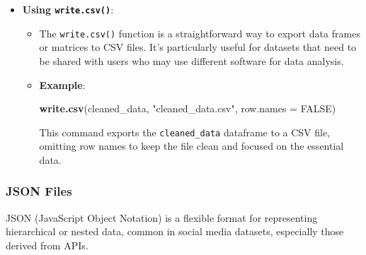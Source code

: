 \documentclass[
]{book}
\newenvironment{Shaded}{\begin{snugshade}}{\end{snugshade}}
\newcommand{\AttributeTok}[1]{\textcolor[rgb]{0.13,0.29,0.53}{#1}}
\newcommand{\ConstantTok}[1]{\textcolor[rgb]{0.56,0.35,0.01}{#1}}
\newcommand{\FunctionTok}[1]{\textcolor[rgb]{0.13,0.29,0.53}{\textbf{#1}}}
\newcommand{\NormalTok}[1]{#1}
\newcommand{\StringTok}[1]{\textcolor[rgb]{0.31,0.60,0.02}{#1}}
\providecommand{\tightlist}{%
  \setlength{\itemsep}{0pt}\setlength{\parskip}{0pt}}
\begin{document}
\begin{itemize}
\tightlist
\item
  \textbf{Using \texttt{write.csv()}}:

  \begin{itemize}
  \item
    The \texttt{write.csv()} function is a straightforward way to export data frames or matrices to CSV files. It's particularly useful for datasets that need to be shared with users who may use different software for data analysis.
  \item
    \textbf{Example}:

\begin{Shaded}
\begin{Highlighting}[]
\FunctionTok{write.csv}\NormalTok{(cleaned\_data, }\StringTok{"cleaned\_data.csv"}\NormalTok{, }\AttributeTok{row.names =} \ConstantTok{FALSE}\NormalTok{)}
\end{Highlighting}
\end{Shaded}

    This command exports the \texttt{cleaned\_data} dataframe to a CSV file, omitting row names to keep the file clean and focused on the essential data.
  \end{itemize}
\end{itemize}

\hypertarget{json-files-1}{%
\subsubsection{JSON Files}\label{json-files-1}}

JSON (JavaScript Object Notation) is a flexible format for representing hierarchical or nested data, common in social media datasets, especially those derived from APIs.
\end{document}
